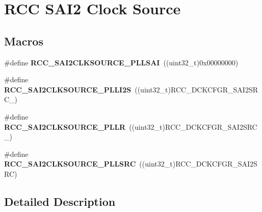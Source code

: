 \hypertarget{group___r_c_c_ex___s_a_i2___clock___source}{}\section{R\+CC S\+A\+I2 Clock Source}
\label{group___r_c_c_ex___s_a_i2___clock___source}
\subsection*{Macros}
\begin{DoxyCompactItemize}
\item 
\#define {\bfseries R\+C\+C\+\_\+\+S\+A\+I2\+C\+L\+K\+S\+O\+U\+R\+C\+E\+\_\+\+P\+L\+L\+S\+AI}~((uint32\+\_\+t)0x00000000)\hypertarget{group___r_c_c_ex___s_a_i2___clock___source_ga67bde078276b61538dfda6a109341baf}{}\label{group___r_c_c_ex___s_a_i2___clock___source_ga67bde078276b61538dfda6a109341baf}

\item 
\#define {\bfseries R\+C\+C\+\_\+\+S\+A\+I2\+C\+L\+K\+S\+O\+U\+R\+C\+E\+\_\+\+P\+L\+L\+I2S}~((uint32\+\_\+t)R\+C\+C\+\_\+\+D\+C\+K\+C\+F\+G\+R\+\_\+\+S\+A\+I2\+S\+R\+C\+\_)\hypertarget{group___r_c_c_ex___s_a_i2___clock___source_gad19397ddc9049869dc7b8f3eb7f3aa1a}{}\label{group___r_c_c_ex___s_a_i2___clock___source_gad19397ddc9049869dc7b8f3eb7f3aa1a}

\item 
\#define {\bfseries R\+C\+C\+\_\+\+S\+A\+I2\+C\+L\+K\+S\+O\+U\+R\+C\+E\+\_\+\+P\+L\+LR}~((uint32\+\_\+t)R\+C\+C\+\_\+\+D\+C\+K\+C\+F\+G\+R\+\_\+\+S\+A\+I2\+S\+R\+C\+\_)\hypertarget{group___r_c_c_ex___s_a_i2___clock___source_ga7f6aa9ab9d3a5684bf0c70b21b3dae0b}{}\label{group___r_c_c_ex___s_a_i2___clock___source_ga7f6aa9ab9d3a5684bf0c70b21b3dae0b}

\item 
\#define {\bfseries R\+C\+C\+\_\+\+S\+A\+I2\+C\+L\+K\+S\+O\+U\+R\+C\+E\+\_\+\+P\+L\+L\+S\+RC}~((uint32\+\_\+t)R\+C\+C\+\_\+\+D\+C\+K\+C\+F\+G\+R\+\_\+\+S\+A\+I2\+S\+RC)\hypertarget{group___r_c_c_ex___s_a_i2___clock___source_ga2f190bfb39b6177d87c0ebf04618b2f1}{}\label{group___r_c_c_ex___s_a_i2___clock___source_ga2f190bfb39b6177d87c0ebf04618b2f1}

\end{DoxyCompactItemize}


\subsection{Detailed Description}
